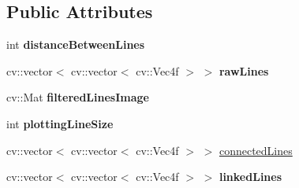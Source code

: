 \subsection*{Public Attributes}
\begin{DoxyCompactItemize}
\item 
\hypertarget{classLinkedLines_a1ef1b71323e4f8b2b360603d965efc1e}{
int {\bfseries distanceBetweenLines}}
\label{classLinkedLines_a1ef1b71323e4f8b2b360603d965efc1e}

\item 
\hypertarget{classLinkedLines_aa2124077aa872cdbac8f3d4f47f5aecb}{
cv::vector$<$ cv::vector$<$ cv::Vec4f $>$ $>$ {\bfseries rawLines}}
\label{classLinkedLines_aa2124077aa872cdbac8f3d4f47f5aecb}

\item 
\hypertarget{classLinkedLines_aadd32fcc3cbf09d51302095e7a378ee3}{
cv::Mat {\bfseries filteredLinesImage}}
\label{classLinkedLines_aadd32fcc3cbf09d51302095e7a378ee3}

\item 
\hypertarget{classLinkedLines_ab86a284ff8b536e9677101d3bc34ccbc}{
int {\bfseries plottingLineSize}}
\label{classLinkedLines_ab86a284ff8b536e9677101d3bc34ccbc}

\item 
cv::vector$<$ cv::vector$<$ cv::Vec4f $>$ $>$ \hyperlink{classLinkedLines_aca22f3054cb33e024bada96faae9ca2f}{connectedLines}
\item 
\hypertarget{classLinkedLines_a26a6fd6e09564b9ed8181302db38b53f}{
cv::vector$<$ cv::vector$<$ cv::Vec4f $>$ $>$ {\bfseries linkedLines}}
\label{classLinkedLines_a26a6fd6e09564b9ed8181302db38b53f}

\end{DoxyCompactItemize}


